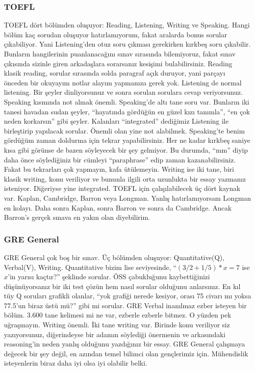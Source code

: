 \documentclass[12pt]{article}
\begin{document}
\subsubsection{TOEFL}
TOEFL dört bölümden oluşuyor: Reading, Listening, Writing ve Speaking. Hangi bölüm kaç sorudan oluşuyor hatırlamıyorum, fakat aralarda bonus sorular çıkabiliyor. Yani Listening’den otuz soru çıkması gerekirken kırkbeş soru çıkabilir. Bunların hangilerinin puanlanacağını sınav sırasında bilemiyoruz, fakat sınav çıkısında sizinle giren arkadaşlara sorarsanız kesişimi bulabilirsiniz. Reading klasik reading, sorular sırasında solda paragraf açık duruyor, yani parçayı önceden bir okuyayım notlar alayım yapmanıza gerek yok. Listening de normal listening. Bir şeyler dinliyorsunuz ve sonra sorulan sorulara cevap veriyorsunuz. Speaking kısmında not almak önemli. Speaking’de altı tane soru var. Bunların iki tanesi havadan sudan şeyler, “hayatında gördüğün en güzel kızı tanımla”, “en çok neden korkarsın” gibi şeyler. Kalanları “integrated” dediğimiz Listening ile birleştirip yapılacak sorular. Önemli olan yine not alabilmek. Speaking’te benim gördüğüm zaman doldurma için tekrar yapabilirsiniz. Her ne kadar kırkbeş saniye kısa gibi görünse de bazen söyleyecek bir şey gelmiyor. Bu durumda, “mm” diyip daha önce söylediğiniz bir cümleyi “paraphrase” edip zaman kazanabilirsiniz. Fakat bu tekrarları çok yapmayın, kafa ütülemeyin. Writing ise iki tane, biri klasik writing, konu veriliyor ve bununla ilgili orta uzunlukta bir essay yazmanız isteniyor. Diğeriyse yine integrated. TOEFL için çalışılabilecek üç dört kaynak var. Kaplan, Cambridge, Barron veya Longman. Yanlış hatırlamıyorsam Longman en kolayı. Daha sonra Kaplan, sonra Barron ve sonra da Cambridge. Ancak Barron’s gerçek sınava en yakın olan diyebilirim.

\subsubsection{GRE General}
GRE General çok boş bir sınav. Üç bölümden oluşuyor: Quantitative(Q), Verbal(V), Writing. Quantitative bizim lise seviyesinde, “$(3/2+1/5)*x=7$ ise $x$’in yarısı kaçtır?” şeklinde sorular. ÖSS çabukluğunu kaybettiğinizi düşünüyorsanız bir iki test çözün hem nasıl sorular olduğunu anlarsınız. En kıl tüy Q soruları grafikli olanlar, “yok grafiği nerede kesiyor, orası 75 civarı mı yoksa 77.5’un biraz üstü mü?” gibi mi sorular. GRE Verbal inanılmaz ezber isteyen bir bölüm. 3.600 tane kelimesi mi ne var, ezberle ezberle bitmez. O yüzden pek uğraşmayın. Writing önemli. İki tane writing var. Birinde konu veriliyor siz yazıyorsunuz, diğerindeyse bir adamın söylediği önermenin ve arkasındaki reasoning’in neden yanlış olduğunu yazdığınız bir essay. GRE General çalışmaya değecek bir şey değil, en azından temel bilimci olan gençlerimiz için. Mühendislik isteyenlerin biraz daha iyi olsa iyi olabilir belki.
\end{document}
